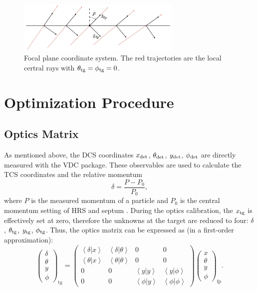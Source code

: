 \begin{figure}[tb!]
  \centering
  \includegraphics[width=0.7\textwidth]{figs/FCS.png}
  \caption[Focal plane coordinate system.]{Focal plane coordinate system. The red trajectories are the local certral rays with $\theta_{\mathrm{tg}}=\phi_{\mathrm{tg}}=0$. \label{C6S1F4}}
\end{figure}

\section{Optimization Procedure}
\label{C6S2}

\subsection{Optics Matrix}
\label{C6S2SS1}

As mentioned above, the DCS coordinates $x_{\mathrm{det}}$, $\theta_{\mathrm{det}}$, $y_{\mathrm{det}}$, $\phi_{\mathrm{det}}$ are directly measured with the VDC package. These  observables are used to calculate the TCS coordinates and the relative momentum
\begin{equation} \label{C6S2E1}
\delta = \frac{P-P_0}{P_0},
\end{equation}
where $P$ is the measured momentum of a particle and $P_0$ is the central momentum setting of HRS and septum \cite{Qiang2007}. During the optics calibration, the $x_{\mathrm{tg}}$ is effectively set at zero, therefore the unknowns at the target are reduced to four: $\delta$, $\theta_{\mathrm{tg}}$, $y_{\mathrm{tg}}$, $\phi_{\mathrm{tg}}$. Thus, the optics matrix can be expressed as (in a first-order approximation):
\begin{equation} \label{C6S2E2}
\left(
\begin{matrix} \delta \\ \theta \\ y \\ \phi \end{matrix}
\right)_{\mathrm{tg}} = \left(
\begin{matrix}
\left<\delta|x\right> & \left<\delta|\theta\right> & 0 & 0 \\
\left<\theta|x\right> & \left<\theta|\theta\right> & 0 & 0 \\
0 & 0 & \left<y|y\right> & \left<y|\phi\right> \\
0 & 0 & \left<\phi|y\right> & \left<\phi|\phi\right>
\end{matrix}
\right)
\left(\begin{matrix} x \\ \theta \\ y \\ \phi \end{matrix}
\right)_{\mathrm{fp}}.
\end{equation}


